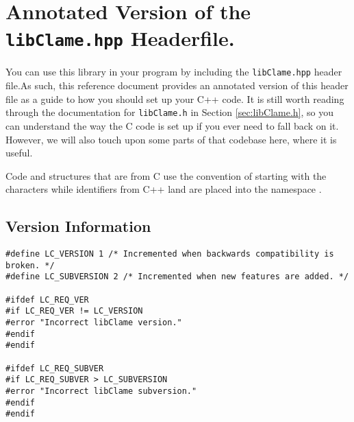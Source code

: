 %
%
%

\section{Annotated Version of the \texttt{libClame.hpp} Headerfile.}

You can use this library in your program by including the \texttt{libClame.hpp} header file.\footnotemark As such, this reference document provides an annotated version of this header file as a guide to how you should set up your C++ code. It is still worth reading through the documentation for \texttt{libClame.h} in Section \ref{sec:libClame.h}, so you can understand the way the C code is set up if you ever need to fall back on it. However, we will also touch upon some parts of that codebase here, where it is useful.

Code and structures that are from C use the convention of starting with the characters  while identifiers from C++ land are placed into the namespace .


\subsection{Version Information}

\begin{verbatim}
#define LC_VERSION 1 /* Incremented when backwards compatibility is broken. */
#define LC_SUBVERSION 2 /* Incremented when new features are added. */

#ifdef LC_REQ_VER
#if LC_REQ_VER != LC_VERSION
#error "Incorrect libClame version."
#endif
#endif

#ifdef LC_REQ_SUBVER
#if LC_REQ_SUBVER > LC_SUBVERSION
#error "Incorrect libClame subversion."
#endif
#endif
\end{verbatim}

